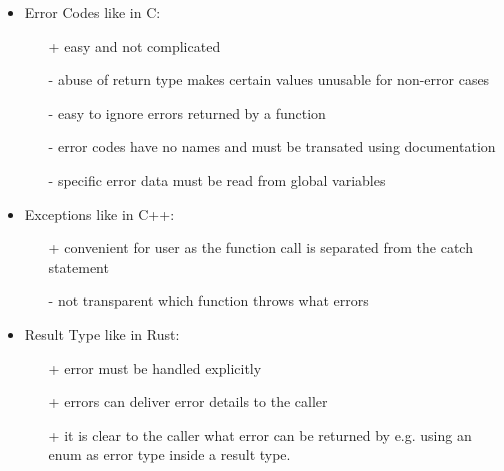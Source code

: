 \begin{itemize}
    \item Error Codes like in C:
          \begin{itemize}
              \item[+] easy and not complicated
              \item[-] abuse of return type makes certain values unusable for non-error cases
              \item[-] easy to ignore errors returned by a function
              \item[-] error codes have no names and must be transated using documentation
              \item[-] specific error data must be read from global variables
          \end{itemize}
    \item Exceptions like in C++:
          \begin{itemize}
              \item[+] convenient for user as the function call is separated from the catch statement
              \item[-] not transparent which function throws what errors
          \end{itemize}
    \item Result Type like in Rust:
          \begin{itemize}
              \item[+] error must be handled explicitly
              \item[+] errors can deliver error details to the caller
              \item[+] it is clear to the caller what error can be returned by e.g. using an enum as error type inside a result type.
          \end{itemize}
\end{itemize}